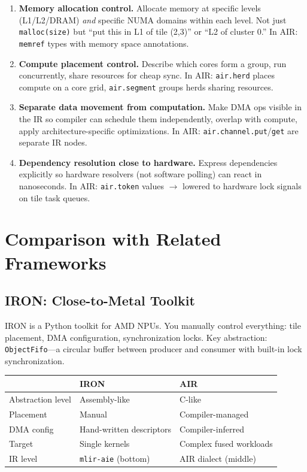 \documentclass[11pt,a4paper]{article}
\begin{document}
\begin{enumerate}[leftmargin=2em]
  \item \textbf{Memory allocation control.} Allocate memory at specific levels
    (L1/L2/DRAM) \emph{and} specific NUMA domains within each level.
    Not just \texttt{malloc(size)} but ``put this in L1 of tile (2,3)'' or
    ``L2 of cluster 0.''
    In AIR: \texttt{memref} types with memory space annotations.

  \item \textbf{Compute placement control.} Describe which cores form a group,
    run concurrently, share resources for cheap sync.
    In AIR: \texttt{air.herd} places compute on a core grid,
    \texttt{air.segment} groups herds sharing resources.

  \item \textbf{Separate data movement from computation.} Make DMA ops visible
    in the IR so compiler can schedule them independently, overlap with compute,
    apply architecture-specific optimizations.
    In AIR: \texttt{air.channel.put}/\texttt{get} are separate IR nodes.

  \item \textbf{Dependency resolution close to hardware.} Express dependencies
    explicitly so hardware resolvers (not software polling) can react in nanoseconds.
    In AIR: \texttt{air.token} values $\rightarrow$ lowered to hardware lock signals
    on tile task queues.
\end{enumerate}


\section{Comparison with Related Frameworks}

\subsection{IRON: Close-to-Metal Toolkit}

IRON is a Python toolkit for AMD NPUs. You manually control everything: tile
placement, DMA configuration, synchronization locks. Key abstraction:
\texttt{ObjectFifo}---a circular buffer between producer and consumer with built-in
lock synchronization.

\begin{center}
\begin{tabular}{lll}
\toprule
& \textbf{IRON} & \textbf{AIR} \\
\midrule
Abstraction level & Assembly-like & C-like \\
Placement & Manual & Compiler-managed \\
DMA config & Hand-written descriptors & Compiler-inferred \\
Target & Single kernels & Complex fused workloads \\
IR level & \texttt{mlir-aie} (bottom) & AIR dialect (middle) \\
\bottomrule
\end{tabular}
\end{center}
\end{document}

